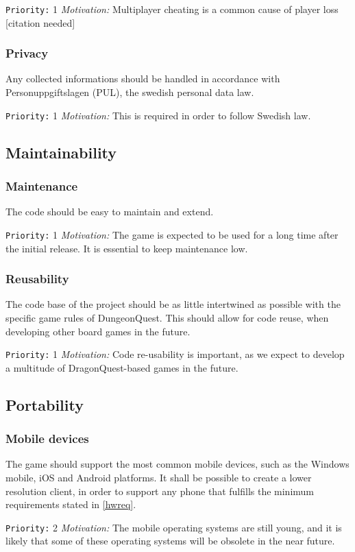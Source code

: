 \documentclass[a4paper,10pt]{article}
\newcommand{\prio}[2]{\texttt{Priority:} #1 \emph{Motivation:} #2}
\begin{document}
\prio{1}{Multiplayer cheating is a common cause of player loss [citation needed]}

\subsubsection{Privacy}
Any collected informations should be handled in accordance with Personuppgiftslagen (PUL), the swedish personal data law.

\prio{1}{This is required in order to follow Swedish law.}

\subsection{Maintainability}
\subsubsection{Maintenance}
The code should be easy to maintain and extend.

\prio{1}{The game is expected to be used for a long time after the initial release. It is essential to keep maintenance low.}


\subsubsection{Reusability}
The code base of the project should be as little intertwined as possible with the specific game rules of DungeonQuest. This should allow for code reuse, when developing other board games in the future.

\prio{1}{Code re-usability is important, as we expect to develop a multitude of DragonQuest-based games in the future.}

\subsection{Portability}
\subsubsection{Mobile devices}
The game should support the most common mobile devices, such as the Windows mobile, iOS and Android platforms. It shall be possible to create a lower resolution client, in order to support any phone that fulfills the minimum requirements stated in \ref{hwreq}.

\prio{2}{The mobile operating systems are still young, and it is likely that some of these operating systems will be obsolete in the near future.}
\end{document}
